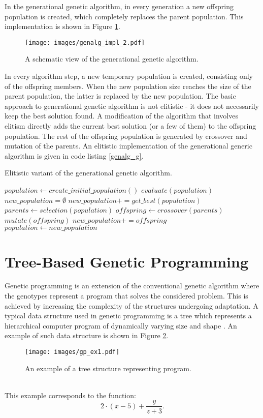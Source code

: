 In the generational genetic algorithm, in every generation a new offspring population is created, which completely replaces the parent population.
This implementation is shown in Figure \ref{genalg:impl_2}.
\begin{figure}[ht]
    \centering
    \texttt{[image: images/genalg\_impl\_2.pdf]}
    \caption{A schematic view of the generational genetic algorithm.}
    \label{genalg:impl_2}
\end{figure}
In every algorithm step, a new temporary population is created, consisting only of the offspring members.
When the new population size reaches the size of the parent population, the latter is replaced by the new population.
The basic approach to generational genetic algorithm is not elitistic - it does not necessarily keep the best solution found. 
A modification of the algorithm that involves elitism directly adds the current best solution (or a few of them) to the offspring population.
The rest of the offspring population is generated by crossover and mutation of the parents.
An elitistic implementation of the generational generic algorithm is given in code listing \ref{genalg_g}.
\begin{algorithm}
\caption{Elitistic variant of the generational genetic algorithm.\label{genalg_g}}
\begin{algorithmic}
\STATE $population \leftarrow create\_initial\_population()$
\STATE $evaluate(population)$
\STATE $new\_population = \emptyset$
\STATE $new\_population += get\_best(population)$
\STATE $parents \leftarrow selection(population)$
\STATE $offspring \leftarrow crossover(parents)$
\STATE $mutate(offspring)$
\STATE $new\_population += offspring$
\ENDWHILE
\STATE $population \leftarrow new\_population$
\ENDWHILE
\end{algorithmic}
\end{algorithm}

\section{Tree-Based Genetic Programming}
Genetic programming is an extension of the conventional genetic algorithm where the genotypes represent a program that solves the considered problem.
This is achieved by increasing the complexity of the structures undergoing adaptation.
A typical data structure used in genetic programming is a tree which represents a hierarchical computer program of dynamically varying size and shape \cite{koza1992genetic}.
An example of such data structure is shown in Figure \ref{genprog:ex1}.
\begin{figure}[ht]
    \centering
    \texttt{[image: images/gp\_ex1.pdf]}
    \caption{An example of a tree structure representing program.}
    \label{genprog:ex1}
\end{figure}
\\This example corresponds to the function:
\begin{equation*}
2 \cdot (x-5) + \frac{y}{z + 3}.
\end{equation*}

